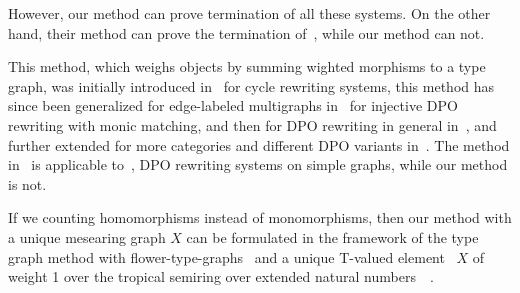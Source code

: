 \begin{example}
\begin{center}
{{
       }
     }
   \end{center}
 \end{example}  
 However, our method can prove termination of all these systems. 
 On the other hand, their method can prove the termination of~\cite[Example 6]{plump2018modular}, while our method can not. 

 This method, which weighs objects by summing wighted morphisms to a type graph, was initially introduced in~\cite{zantema2014termination} for cycle rewriting systems, this method has since been generalized for edge-labeled multigraphs in~\cite{bruggink2014termination} for injective DPO rewriting with monic matching, and then for DPO rewriting in general in~\cite{bruggink2015proving}, and further extended for more categories and different DPO variants in~\cite{endrullis2023generalized}. The method in~\cite{endrullis2023generalized} is applicable to~\cite[Examples 6.4, 6.5 and D.4]{endrullis2024generalized_arxiv_v2}, DPO rewriting systems on simple graphs, while our method is not.

If we counting homomorphisms instead of monomorphisms, then our method with a unique mesearing graph $X$ can be formulated in the framework of the type graph method with flower-type-graphs~\cite[Definition 6]{bruggink2015proving} and a unique T-valued element~\cite[Definition 3.1]{endrullis2024generalized_arxiv_v2} $X$ of weight 1 over the tropical semiring over extended natural numbers~\cite[Example 1]{bruggink2015proving}~\cite[Definition 2.7]{endrullis2024generalized_arxiv_v2}.
 
